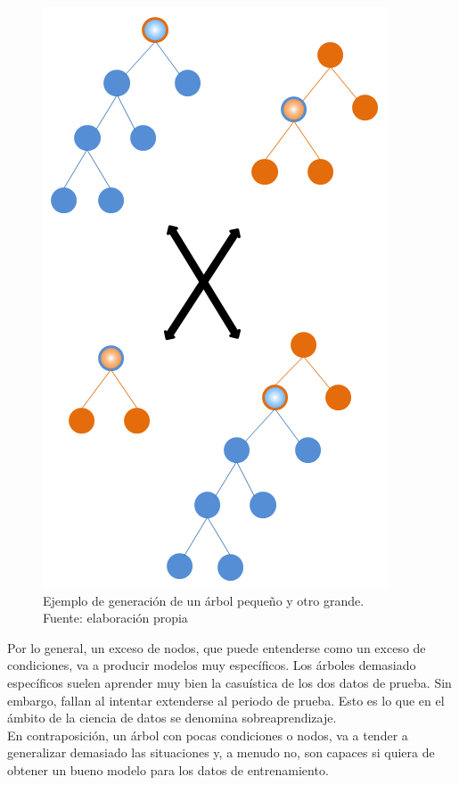      	\begin{figure}[H]
     		\centering
     		\includegraphics[scale=0.4]{imagenes/small_crossover.png}
     		\caption[Ejemplo de generaci\'on de un \'arbol peque\~no]{Ejemplo de generaci\'on de un \'arbol peque\~no y otro grande.\\ Fuente: elaboraci\'on propia}
     		\label{fig:small_crossover}
     	\end{figure}


Por lo general, un exceso de nodos, que puede entenderse como un exceso de condiciones, va a producir modelos muy espec\'ificos. Los \'arboles demasiado espec\'ificos suelen aprender muy bien la casu\'istica de los dos datos de prueba. Sin embargo, fallan al intentar extenderse al periodo de prueba. Esto es lo que en el \'ambito de la ciencia de datos se denomina sobreaprendizaje.\\

En contraposici\'on, un \'arbol con pocas condiciones o nodos, va a tender a generalizar demasiado las situaciones y, a menudo no, son capaces si quiera de obtener un bueno modelo para los datos de entrenamiento.\\

